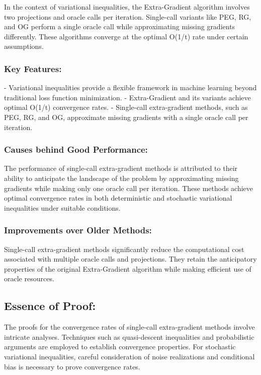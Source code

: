 \documentclass[11pt]{article}
\begin{document}
        In the context of variational inequalities, the Extra-Gradient algorithm involves two projections and oracle calls per iteration. Single-call variants like PEG, RG, and OG perform a single oracle call while approximating missing gradients differently. These algorithms converge at the optimal O(1/t) rate under certain assumptions.
		
		\subsubsection{Key Features: }
  
        - Variational inequalities provide a flexible framework in machine learning beyond traditional loss function minimization.
        - Extra-Gradient and its variants achieve optimal O(1/t) convergence rates.
        - Single-call extra-gradient methods, such as PEG, RG, and OG, approximate missing gradients with a single oracle call per iteration.
		
		\subsubsection{Causes behind Good Performance: }
  
        The performance of single-call extra-gradient methods is attributed to their ability to anticipate the landscape of the problem by approximating missing gradients while making only one oracle call per iteration. These methods achieve optimal convergence rates in both deterministic and stochastic variational inequalities under suitable conditions.
		
		\subsubsection{Improvements over Older Methods: }
  
        Single-call extra-gradient methods significantly reduce the computational cost associated with multiple oracle calls and projections. They retain the anticipatory properties of the original Extra-Gradient algorithm while making efficient use of oracle resources.
	
	\subsection{Essence of Proof: }
        
        The proofs for the convergence rates of single-call extra-gradient methods involve intricate analyses. Techniques such as quasi-descent inequalities and probabilistic arguments are employed to establish convergence properties. For stochastic variational inequalities, careful consideration of noise realizations and conditional bias is necessary to prove convergence rates.
	
\end{document}
